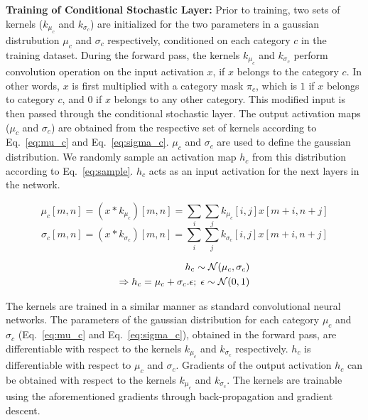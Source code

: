 \documentclass[12pt, letterpaper]{article}
\begin{document}
\noindent \textbf{Training of Conditional Stochastic Layer:}
Prior to training, two sets of kernels ($k_{\mu_c}$ and $k_{\sigma_c}$) are initialized for the two parameters in a gaussian distrubution $\mu_c$ and $\sigma_c$ respectively, conditioned on each category $c$ in the training dataset. During the forward pass, the kernels $k_{\mu_c}$ and $k_{\sigma_c}$ perform convolution operation on the input activation $x$, if $x$ belongs to the category $c$. In other words, $x$ is first multiplied with a category mask $\pi_c$, which is $1$ if $x$ belongs to category $c$, and $0$ if $x$ belongs to any other category. This modified input is then passed through the conditional stochastic layer. The output activation maps ($\mu_c$ and $\sigma_c$) are obtained from the respective set of kernels according to Eq.~\eqref{eq:mu_c} and Eq.~\eqref{eq:sigma_c}. $\mu_c$ and $\sigma_c$ are used to define the gaussian distribution. We randomly sample an activation map  $h_c$ from this distribution according to Eq.~\eqref{eq:sample}. $h_c$ acts as an input activation for the next layers in the network. 

\begin{equation}
  \mu_c[m,n]=(x * k_{\mu_c})[m,n]=\sum_i \sum_j k_{\mu_c}[i,j]x[m+i,n+j]
  \label{eq:mu_c}
\end{equation}
\begin{equation}
  \sigma_c[m,n]=(x * k_{\sigma_c})[m,n]=\sum_i \sum_j k_{\sigma_c}[i,j]x[m+i,n+j]
  \label{eq:sigma_c}
\end{equation}

\begin{align}
  h_\mathrm{c} \sim \mathcal{N}(\mu_c,\sigma_c) \notag\\
  \Rightarrow h_c=\mu_c + \sigma_c.\epsilon;\; \epsilon \sim \mathcal{N}(0,1)
  \label{eq:sample}
\end{align}

The kernels are trained in a similar manner as standard convolutional neural networks. The parameters of the gaussian distribution for each category $\mu_c$ and $\sigma_c$ (Eq.~\eqref{eq:mu_c} and Eq.~\eqref{eq:sigma_c}), obtained in the forward pass, are differentiable with respect to the kernels $k_{\mu_c}$ and $k_{\sigma_c}$ respectively. $h_c$ is differentiable with respect to $\mu_c$ and $\sigma_c$. Gradients of the output activation $h_c$ can be obtained with respect to the kernels  $k_{\mu_c}$ and $k_{\sigma_c}$. The kernels are trainable using the aforementioned gradients through back-propagation and gradient descent. 
\end{document}
